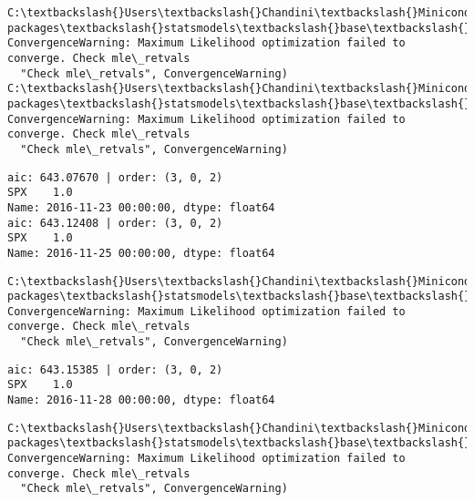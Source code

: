 \documentclass[11pt]{article}
\begin{document}
    \begin{Verbatim}[commandchars=\\\{\}]
C:\textbackslash{}Users\textbackslash{}Chandini\textbackslash{}Miniconda3\textbackslash{}envs\textbackslash{}auquan\textbackslash{}lib\textbackslash{}site-packages\textbackslash{}statsmodels\textbackslash{}base\textbackslash{}model.py:496: ConvergenceWarning: Maximum Likelihood optimization failed to converge. Check mle\_retvals
  "Check mle\_retvals", ConvergenceWarning)
C:\textbackslash{}Users\textbackslash{}Chandini\textbackslash{}Miniconda3\textbackslash{}envs\textbackslash{}auquan\textbackslash{}lib\textbackslash{}site-packages\textbackslash{}statsmodels\textbackslash{}base\textbackslash{}model.py:496: ConvergenceWarning: Maximum Likelihood optimization failed to converge. Check mle\_retvals
  "Check mle\_retvals", ConvergenceWarning)

    \end{Verbatim}

    \begin{Verbatim}[commandchars=\\\{\}]
aic: 643.07670 | order: (3, 0, 2)
SPX    1.0
Name: 2016-11-23 00:00:00, dtype: float64
aic: 643.12408 | order: (3, 0, 2)
SPX    1.0
Name: 2016-11-25 00:00:00, dtype: float64

    \end{Verbatim}

    \begin{Verbatim}[commandchars=\\\{\}]
C:\textbackslash{}Users\textbackslash{}Chandini\textbackslash{}Miniconda3\textbackslash{}envs\textbackslash{}auquan\textbackslash{}lib\textbackslash{}site-packages\textbackslash{}statsmodels\textbackslash{}base\textbackslash{}model.py:496: ConvergenceWarning: Maximum Likelihood optimization failed to converge. Check mle\_retvals
  "Check mle\_retvals", ConvergenceWarning)

    \end{Verbatim}

    \begin{Verbatim}[commandchars=\\\{\}]
aic: 643.15385 | order: (3, 0, 2)
SPX    1.0
Name: 2016-11-28 00:00:00, dtype: float64

    \end{Verbatim}

    \begin{Verbatim}[commandchars=\\\{\}]
C:\textbackslash{}Users\textbackslash{}Chandini\textbackslash{}Miniconda3\textbackslash{}envs\textbackslash{}auquan\textbackslash{}lib\textbackslash{}site-packages\textbackslash{}statsmodels\textbackslash{}base\textbackslash{}model.py:496: ConvergenceWarning: Maximum Likelihood optimization failed to converge. Check mle\_retvals
  "Check mle\_retvals", ConvergenceWarning)

    \end{Verbatim}
\end{document}
